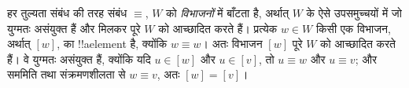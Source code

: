 \documentclass[../../../include/open-logic-section]{subfiles}
\begin{document}
हर तुल्यता संबंध की तरह संबंध $\equiv$, $W$ को \emph{विभाजनों} में
बाँटता है, अर्थात् $W$ के ऐसे उपसमुच्चयों में जो युग्मतः असंयुक्त हैं और
मिलकर पूरे $W$ को आच्छादित करते हैं। प्रत्येक $w \in W$ किसी एक विभाजन,
अर्थात् $[w]$, का !!a{element} है, क्योंकि $w \equiv w$। अतः विभाजन $[w]$
पूरे $W$ को आच्छादित करते हैं। वे युग्मतः असंयुक्त हैं, क्योंकि यदि $u
\in [w]$ और $u \in [v]$, तो $u \equiv w$ और $u \equiv v$; और सममिति
तथा संक्रमणशीलता से $w \equiv v$, अतः $[w] = [v]$।
\end{document}
